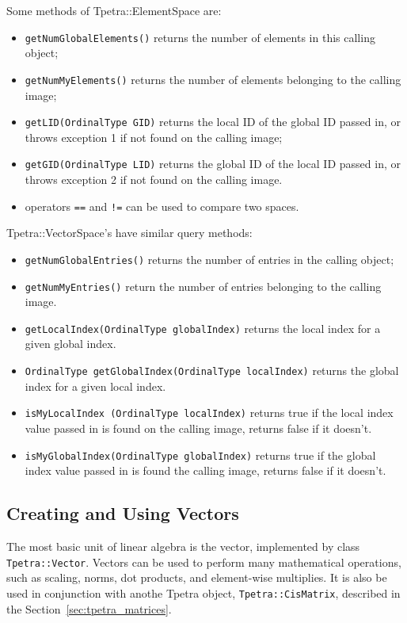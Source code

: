 Some methods of Tpetra::ElementSpace are:
\begin{itemize}
\itemsep=1pt
\item {\tt getNumGlobalElements()} returns the number of elements in this
calling object;
\item {\tt getNumMyElements()} returns the number of elements belonging to
the calling image;
\item {\tt getLID(OrdinalType GID)} returns the local ID of the global 
ID passed in, or throws exception 1 if not found on the calling image;
\item {\tt getGID(OrdinalType LID)} returns the global ID of the local 
ID passed in, or throws exception 2 if not found on the calling image. 
\item operators \verb!==! and \verb$!=$ can be used to compare two spaces.
\end{itemize}
Tpetra::VectorSpace's have similar query methods:
\begin{itemize}
\itemsep=1pt
\item {\tt getNumGlobalEntries()} returns the number of entries in the 
calling object;
\item {\tt getNumMyEntries()} return the number of entries belonging to the
calling image. 
\item {\tt getLocalIndex(OrdinalType globalIndex)} returns
the local index for a given global index.
\item {\tt OrdinalType getGlobalIndex(OrdinalType localIndex)} returns
the global index for a given local index.
\item {\tt isMyLocalIndex (OrdinalType localIndex)} returns true if the local
index value passed in is found on the calling image, returns false if it
doesn't.
\item {\tt isMyGlobalIndex(OrdinalType globalIndex)} returns
true if the global index value passed in is found the calling
image, returns false if it doesn't. 
\end{itemize}


\subsection{Creating and Using Vectors}
\label{sec:tpetra_vectors}

The most basic unit of linear algebra is the vector, implemented by class {\tt
  Tpetra::Vector}. Vectors can be used to perform many mathematical
  operations, such as scaling, norms, dot products, and element-wise
  multiplies. It is also be used in conjunction with anothe Tpetra object,
{\tt Tpetra::CisMatrix}, described in the Section~\ref{sec:tpetra_matrices}.

